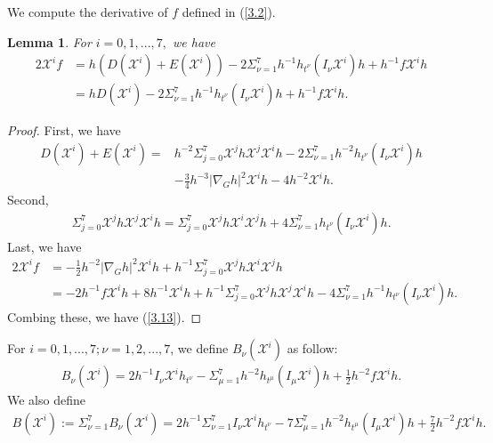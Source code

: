 \documentclass[reqno,12pt]{amsart}
\numberwithin{equation}{section}
\theoremstyle{plain}
\newtheorem{lemma}[theorem]{Lemma}
\theoremstyle{definition}
\begin{document}
  We compute the derivative of $f$ defined in (\ref{3.2}).
  \begin{lemma}\label{lemma3.2} For $i=0,1,...,7,$ we have
  \begin{equation}\label{3.13}       \begin{aligned}
    2\mathscr{X}^i f&=h(D(\mathscr{X}^i)+E(\mathscr{X}^i))- 2\Sigma_{\nu=1}^7h^{-1}h_{t^\nu}(I_\nu \mathscr{X}^i)h+h^{-1}f\mathscr{X}^ih\\&=hD(\mathscr{X}^i)- 2\Sigma_{\nu=1}^7h^{-1}h_{t^\nu}(I_\nu \mathscr{X}^i)h+h^{-1}f\mathscr{X}^ih.\end{aligned}   \end{equation}
          \end{lemma}
\begin{proof}

 First, we have
    \begin{align*}
    D(\mathscr{X}^i)+E(\mathscr{X}^i)=&h^{-2}\Sigma_{j=0}^7\mathscr{X}^jh\mathscr{X}^j\mathscr{X}^ih-2\Sigma_{\nu=1}^7h^{-2}h_{t^\nu}(I_\nu \mathscr{X}^i)h\\&-\frac{3}{4}h^{-3}|\nabla_G h|^2\mathscr{X}^ih-4h^{-2}\mathscr{X}^ih.
\end{align*}
Second,
\begin{align*}
    \Sigma_{j=0}^7\mathscr{X}^j h \mathscr{X}^j\mathscr{X}^ih=\Sigma_{j=0}^7\mathscr{X}^j h \mathscr{X}^i\mathscr{X}^j h+4\Sigma_{\nu=1}^7h_{t^\nu}(I_\nu \mathscr{X}^i) h.
    \end{align*} 
    Last, we have
\begin{align*}
    2\mathscr{X}^if&=-\frac{1}{2}h^{-2}|\nabla_G h|^2\mathscr{X}^ih+h^{-1}\Sigma_{j=0}^7\mathscr{X}^j h \mathscr{X}^i\mathscr{X}^j h\\&=-2h^{-1}f\mathscr{X}^ih+8h^{-1}\mathscr{X}^ih+h^{-1}\Sigma_{j=0}^7\mathscr{X}^jh\mathscr{X}^j\mathscr{X}^ih-4\Sigma_{\nu=1}^7h^{-1}h_{t^\nu}(I_\nu \mathscr{X}^i)h.
    \end{align*}
    Combing these, we have (\ref{3.13}).
    \end{proof}
For $i=0,1,...,7; \nu=1,2,...,7$, we define $B_\nu(\mathscr{X}^i)$ as follow:
\begin{align}\label{3.14}
    B_\nu(\mathscr{X}^i)=2h^{-1}I_\nu \mathscr{X}^i h_{t^\nu}-\Sigma_{\mu=1}^7h^{-2}h_{t^\mu}(I_\mu \mathscr{X}^i)h+\frac{1}{2}h^{-2}f\mathscr{X}^ih.
\end{align}
 We also define
\begin{align}\label{3.15}
    B(\mathscr{X}^i):=\Sigma_{\nu=1}^7 B_\nu (\mathscr{X}^i)=2h^{-1}\Sigma_{\nu=1}^7I_\nu \mathscr{X}^i h_{t^\nu}-7\Sigma_{\mu=1}^7h^{-2}h_{t^\mu}(I_\mu \mathscr{X}^i)h+\frac{7}{2}h^{-2}f\mathscr{X}^ih.\end{align}
\end{document}
